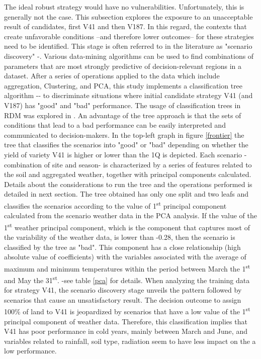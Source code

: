 \documentclass[syngen,nonblindrev]{informs3-syngen}
\begin{document}
The ideal robust strategy would have no vulnerabilities. 
Unfortunately, this is generally not the case. 
This subsection explores the exposure to an unacceptable result of candidates, first V41 and then V187. 
In this regard, the contexts that create unfavorable conditions –and therefore lower outcomes– for these strategies need to be identified. 
This stage is often referred to in the literature as "scenario discovery" -\cite{bryant2010thinking}. 
Various data-mining algorithms can be used to find combinations of parameters that are most strongly predictive of decision-relevant regions in a dataset. 
After a series of operations applied to the data which include aggregation, Clustering, and PCA, this study implements a classification tree algorithm -\cite{breiman1984classification}- to discriminate situations where initial candidate strategy V41 (and V187) has "good" and "bad" performance. 
The usage of classification trees in RDM was explored in \cite{lempert2008comparing}. 
An advantage of the tree approach is that the sets of conditions that lead to a bad performance can be easily interpreted and communicated to decision-makers. 
In the top-left graph in figure \ref{frontier} the tree that classifies the scenarios into "good" or "bad" depending on whether the yield of variety V41 is higher or lower than the 1Q is depicted. 
Each scenario -combination of site and season- is characterized by a series of features related to the soil and aggregated weather, together with principal components calculated. 
Details about the considerations to run the tree and the operations performed is detailed in next section.
The tree obtained has only one split and two leafs and classifies the scenarios according to the value of 1\textsuperscript{st} principal component calculated from the scenario weather data in the PCA analysis. 
If the value of the 1\textsuperscript{st} weather principal component, which is the component that captures most of the variability of the weather data, is lower than -0.28, then the scenario is classified by the tree as "bad".
This component has a close relationship (high absolute value of coefficients) with the variables associated with the average of maximum and minimum temperatures within the period between March the 1\textsuperscript{st} and May the 31\textsuperscript{st}. -see table \ref{pca} for details. 
When analyzing the training data for strategy V41, the scenario discovery stage unveils the pattern followed by scenarios that cause an unsatisfactory result. 
The decision outcome to assign 100\% of land to V41 is jeopardized by scenarios that have a low value of the 1\textsuperscript{st} principal component of weather data. 
Therefore, this classification implies that V41 has poor performance in cold years, mainly between March and June, and variables related to rainfall, soil type, radiation seem to have less impact on the a low performance.
\end{document}
